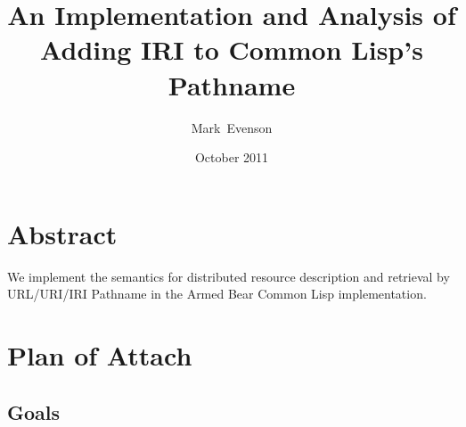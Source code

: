 \documentclass[10pt]{article}
\begin{document}
\title{An Implementation and Analysis of Adding IRI to Common Lisp's Pathname}
\date{October 2011}
\author{Mark~Evenson}

\maketitle

\section{Abstract}

We implement the semantics for distributed resource description and
retrieval by URL/URI/IRI Pathname in the Armed Bear Common Lisp
implementation.

\section{Plan of Attach}
\subsection{Goals}
\end{document}
